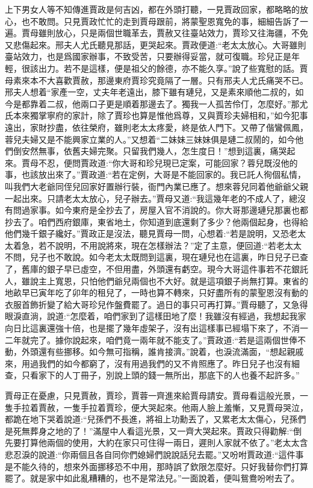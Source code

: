 \begin{parag}
    上下男女人等不知傳進賈政是何吉凶，都在外頭打聽，一見賈政回家，都略略的放心，也不敢問。只見賈政忙忙的走到賈母跟前，將蒙聖恩寬免的事，細細告訴了一遍。賈母雖則放心，只是兩個世職革去，賈赦又往臺站效力，賈珍又往海疆，不免又悲傷起來。邢夫人尤氏聽見那話，更哭起來。賈政便道:“老太太放心。大哥雖則臺站效力，也是爲國家辦事，不致受苦，只要辦得妥當，就可復職。珍兒正是年輕，很該出力。若不是這樣，便是祖父的餘德，亦不能久享。”說了些寬慰的話。賈母素來本不大喜歡賈赦，那邊東府賈珍究竟隔了一層。只有邢夫人尤氏痛哭不已。邢夫人想着“家產一空，丈夫年老遠出，膝下雖有璉兒，又是素來順他二叔的，如今是都靠着二叔，他兩口子更是順着那邊去了。獨我一人孤苦伶仃，怎麼好。”那尤氏本來獨掌寧府的家計，除了賈珍也算是惟他爲尊，又與賈珍夫婦相和，”如今犯事遠出，家財抄盡，依往榮府，雖則老太太疼愛，終是依人門下。又帶了偕鸞佩鳳，蓉兒夫婦又是不能興家立業的人。”又想着“二妹妹三妹妹俱是璉二叔鬧的，如今他們倒安然無事，依舊夫婦完聚。只留我們幾人，怎生度日！”想到這裏，痛哭起來。賈母不忍，便問賈政道:“你大哥和珍兒現已定案，可能回家？蓉兒既沒他的事，也該放出來了。”賈政道:“若在定例，大哥是不能回家的。我已託人徇個私情，叫我們大老爺同侄兒回家好置辦行裝，衙門內業已應了。想來蓉兒同着他爺爺父親一起出來。只請老太太放心，兒子辦去。”賈母又道:“我這幾年老的不成人了，總沒有問過家事。如今東府是全抄去了，房屋入官不消說的。你大哥那邊璉兒那裏也都抄去了。咱們西府銀庫，東省地土，你知道到底還剩了多少？他兩個起身，也得給他們幾千銀子纔好。”賈政正是沒法，聽見賈母一問，心想着:“若是說明，又恐老太太着急，若不說明，不用說將來，現在怎樣辦法？”定了主意，便回道:“若老太太不問，兒子也不敢說。如今老太太既問到這裏，現在璉兒也在這裏，昨日兒子已查了，舊庫的銀子早已虛空，不但用盡，外頭還有虧空。現今大哥這件事若不花銀託人，雖說主上寬恩，只怕他們爺兒兩個也不大好。就是這項銀子尚無打算。東省的地畝早已寅年吃了卯年的租兒了，一時也算不轉來，只好盡所有的蒙聖恩沒有動的衣服首飾折變了給大哥珍兒作盤費罷了。過日的事只可再打算。”賈母聽了，又急得眼淚直淌，說道:“怎麼着，咱們家到了這樣田地了麼！我雖沒有經過，我想起我家向日比這裏還強十倍，也是擺了幾年虛架子，沒有出這樣事已經塌下來了，不消一二年就完了。據你說起來，咱們竟一兩年就不能支了。”賈政道:“若是這兩個世俸不動，外頭還有些挪移。如今無可指稱，誰肯接濟。”說着，也淚流滿面，“想起親戚來，用過我們的如今都窮了，沒有用過我們的又不肯照應了。昨日兒子也沒有細查，只看家下的人丁冊子，別說上頭的錢一無所出，那底下的人也養不起許多。”
\end{parag}


\begin{parag}
    賈母正在憂慮，只見賈赦，賈珍，賈蓉一齊進來給賈母請安。賈母看這般光景，一隻手拉着賈赦，一隻手拉着賈珍，便大哭起來。他兩人臉上羞慚，又見賈母哭泣，都跪在地下哭着說道:“兒孫們不長進，將祖上功勳丟了，又累老太太傷心，兒孫們是死無葬身之地的了！”滿屋中人看這光景，又一齊大哭起來。賈政只得勸解:“倒先要打算他兩個的使用，大約在家只可住得一兩日，遲則人家就不依了。”老太太含悲忍淚的說道:“你兩個且各自同你們媳婦們說說話兒去罷。”又吩咐賈政道:“這件事是不能久待的，想來外面挪移恐不中用，那時誤了欽限怎麼好。只好我替你們打算罷了。就是家中如此亂糟糟的，也不是常法兒。”一面說着，便叫鴛鴦吩咐去了。
\end{parag}


